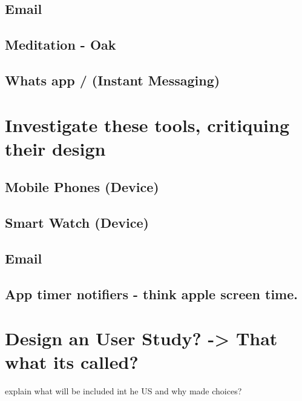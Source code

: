 \documentclass{sigchi}
\begin{document}
		
		\subsection{Email}
		
		
		\subsection{Meditation - Oak}
		
		
		\subsection{Whats app / (Instant Messaging)}


\section{Investigate these tools, critiquing their design}
		\subsection{Mobile Phones (Device)}
		\subsection{Smart Watch (Device)}
		\subsection{Email}
		\subsection{App timer notifiers - think apple screen time.}
	
	



\section{Design an User Study? -> That what its called?}
	explain what will be included int he US and why made choices?
\end{document}
